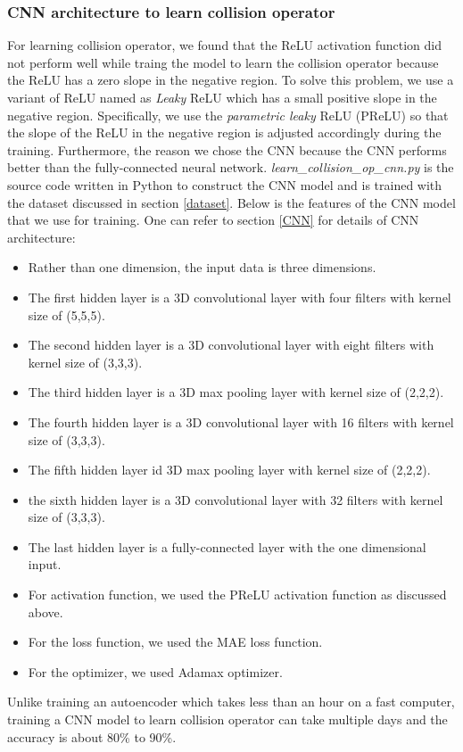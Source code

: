 \documentclass{article}
\begin{document}
\subsubsection{CNN architecture to learn collision operator} \label{learnCollOpCNN}
For learning collision operator, we found that the ReLU activation function did not perform well while traing the model to learn the collision operator because the ReLU has a zero slope in the negative region. To solve this problem, we use a variant of ReLU named as \emph{Leaky} ReLU which has a small positive slope in the negative region. Specifically, we use the \emph{parametric leaky} ReLU (PReLU) so that the slope of the ReLU in the negative region is adjusted accordingly during the training. Furthermore, the reason we chose the CNN because the CNN performs better than the fully-connected neural network. \emph{learn\_collision\_op\_cnn.py} is the source code written in Python to construct the CNN model and is trained with the dataset discussed in section \ref{dataset}. Below is the features of the CNN model that we use for training. One can refer to section \ref{CNN} for details of CNN architecture:

\begin{itemize}
	\item Rather than one dimension, the input data is three dimensions.
	\item The first hidden layer is a 3D convolutional layer with four filters with kernel size of (5,5,5).
	\item The second hidden layer is a 3D convolutional layer with eight filters with kernel size of (3,3,3).
	\item The third hidden layer is a 3D max pooling layer with kernel size of (2,2,2).
	\item The fourth hidden layer is a 3D convolutional layer with 16 filters with kernel size of (3,3,3).
	\item The fifth hidden layer id 3D max pooling layer with kernel size of (2,2,2).
	\item the sixth hidden layer is a 3D convolutional layer with 32 filters with kernel size of (3,3,3).
	\item The last hidden layer is a fully-connected layer with the one dimensional input.
	\item For activation function, we used the PReLU activation function as discussed above.
	\item For the loss function, we used the MAE loss function.
	\item For the optimizer, we used Adamax optimizer.
\end{itemize}
Unlike training an autoencoder which takes less than an hour on a fast computer, training a CNN model to learn collision operator can take multiple days and the accuracy is about 80\% to 90\%.
\end{document}
